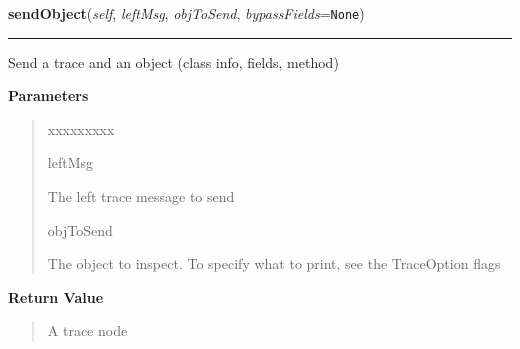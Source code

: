     \label{tracetool:TraceToSend:sendObject}

    \vspace{0.5ex}

\hspace{.8\funcindent}\begin{boxedminipage}{\funcwidth}

    \raggedright \textbf{sendObject}(\textit{self}, \textit{leftMsg}, \textit{objToSend}, \textit{bypassFields}={\tt None})

    \vspace{-1.5ex}

    \rule{\textwidth}{0.5\fboxrule}
\setlength{\parskip}{2ex}
    Send a trace and an object (class info, fields, method)

\setlength{\parskip}{1ex}
      \textbf{Parameters}
      \vspace{-1ex}

      \begin{quote}
        \begin{Ventry}{xxxxxxxxx}

          \item[leftMsg]

          The left trace message to send

          \item[objToSend]

          The object to inspect. To specify what to print, see the 
          TraceOption flags

        \end{Ventry}

      \end{quote}

      \textbf{Return Value}
    \vspace{-1ex}

      \begin{quote}
      A trace node

      \end{quote}

    \end{boxedminipage}

    \label{tracetool:TraceToSend:sendStack}

    \vspace{0.5ex}


